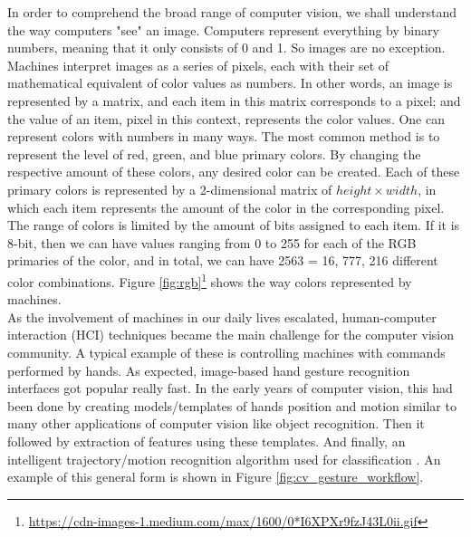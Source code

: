 In order to comprehend the broad range of computer vision, we shall understand the way computers "see" an image. Computers represent everything by binary numbers, meaning that it only consists of 0 and  1.  So images are no exception.   Machines interpret images as a series of pixels, each with their set of mathematical equivalent of color values as numbers.   In other words, an image is represented by a matrix, and each item in this matrix corresponds to a pixel; and the value of an item,  pixel in this context, represents the color values.  One can represent colors with numbers in many ways.  The most common method is to represent the level of red, green, and blue primary colors. By changing the respective amount of these colors, any desired color can be created. Each of these primary colors is represented by a 2-dimensional matrix of $height \times width$, in which each item represents the amount of the color in the corresponding pixel.\\

The range of colors is limited by the amount of bits assigned to each item.  If it is 8-bit, then we can have values ranging from 0 to 255 for each of the RGB primaries of the color, and in total, we can have 2563 = 16, 777, 216 different color combinations. Figure \ref{fig:rgb}\footnote{\url{https://cdn-images-1.medium.com/max/1600/0*I6XPXr9fzJ43L0ii.gif}} shows the way colors represented by machines.\\

As the involvement of machines in our daily lives escalated, human-computer interaction (HCI)  techniques became the main challenge for the computer vision community.   A typical example of these is controlling machines with commands performed by hands. As expected, image-based hand gesture recognition interfaces \cite{pavlovic_visual_1997} got popular really fast.  In the early years of computer vision, this had been done by creating models/templates of hands position and motion similar to many other applications of computer vision like object recognition.  Then it followed by extraction  of features using these templates.  And finally, an intelligent trajectory/motion recognition algorithm  used for classification \cite{jiang_dynamic_2013}. An example of this general form is shown in Figure \ref{fig:cv_gesture_workflow}.\\

